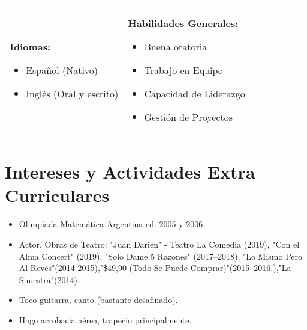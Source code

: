 \documentclass[11pt,a4paper,roman]{moderncv}        %
\begin{document}
	 \vspace{6pt}	
	
	 \begin{tabular}{l l}		
		\begin{minipage}[t]{0.4\textwidth}		 	
		 	\textbf{Idiomas:} 
			\vspace{3pt}
		 	\begin{itemize}
		 		\item Español (Nativo)
		 		\item Inglés (Oral y escrito)
		 	\end{itemize}
		\end{minipage}
	  &
		\begin{minipage}[t]{0.6\textwidth}	
			\textbf{Habilidades Generales:}
			\vspace{3pt}
			\begin{itemize}
				\item Buena oratoria
				\item Trabajo en Equipo
				\item Capacidad de Liderazgo
				\item Gestión de Proyectos
			\end{itemize}
		\end{minipage}			
	\end{tabular}

	\vspace{6pt}
	
	\section{Intereses y Actividades Extra Curriculares}
	
	\vspace{6pt}
	
	\begin{itemize}
		
		\item{Olimpíada Matemática Argentina ed. 2005 y 2006.}
		
		\vspace{6pt}
		
		\item{Actor. Obras de Teatro: "Juan Darién" - Teatro La Comedia (2019), "Con el Alma Concert" (2019), "Solo Dame 5 Razones" (2017--2018), "Lo Mismo Pero Al Revés"(2014-2015),"\$49,90 (Todo Se Puede Comprar)"(2015--2016.),"La Siniestra"(2014).}
		
		\vspace{6pt}
		
		\item{Toco guitarra, canto (bastante desafinado).}
		
		\vspace{6pt}
		
		\item{Hago acrobacia aérea, trapecio principalmente.}
	\end{itemize}
	
	\nocite{*}
	
	
\end{document}
